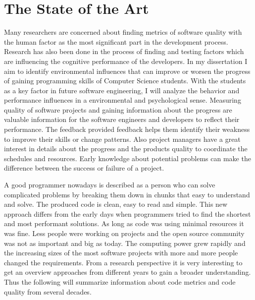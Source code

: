 \chapter{The State of the Art}

\begin{flushleft}
Many researchers are concerned about finding metrics of software quality with the human factor as the most significant part in the development process. 
Research has also been done in the process of finding and testing factors which are influencing the cognitive performance of the developers.
In my dissertation I aim to identify environmental influences that can improve or worsen the progress of gaining programming skills of Computer Science students.
With the students as a key factor in future software engineering, I will analyze the behavior and performance influences in a environmental and psychological sense. 
\cite{denissen2008effects}
Measuring quality of software projects and gaining information about the progress are valuable information for the software engineers and developers to reflect their performance. The feedback provided feedback helps them identify their weakness to improve their skills or change patterns. 
\cite{johnson1999leap}
\cite{Martin:2008:CCH:1388398}
Also project managers have a great interest in details about the progress and the products quality to coordinate the schedules and resources. 
Early knowledge about potential problems can make the difference between the success or failure of a project.

A good programmer nowadays is described as a person who can solve complicated problems by breaking them down in chunks that easy to understand and solve. The produced code is clean, easy to read and simple. \cite{johnson1999leap}
This new approach differs from the early days when programmers tried to find the shortest and most performant solutions. As long as code was using minimal resources it was fine. Less people were working on projects and the open source community was not as important and big as today. 
The computing power grew rapidly and the increasing sizes of the most software projects with more and more people changed the requirements. 
From a research perspective it is very interesting to get an overview approaches from different years to gain a broader understanding. Thus the following will summarize information about code metrics and code quality from several decades.
\end{flushleft}


